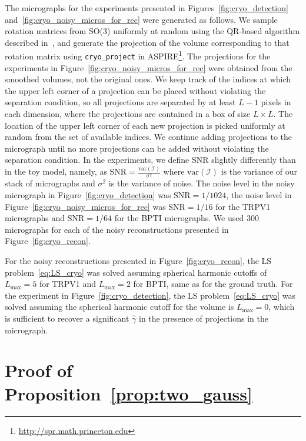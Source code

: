 \documentclass[12pt]{article}
\newcommand{\1}{\mathbf{1}}
\theoremstyle{plain}
\theoremstyle{definition}
\theoremstyle{remark}
\theoremstyle{plain}
\theoremstyle{remark}
\theoremstyle{plain}
\theoremstyle{plain}
\begin{document}
The micrographs for the experiments presented in Figures~\ref{fig:cryo_detection}  {and~\ref{fig:cryo_noisy_micros_for_rec}} were generated as follows. 
We sample rotation matrices from SO(3) uniformly at random using the QR-based algorithm described in~\cite{stewart1980efficient}, and generate the projection of the volume corresponding to that rotation matrix using \verb|cryo_project| in ASPIRE\footnote{\url{http://spr.math.princeton.edu}}. The projections for the experiments in Figure~\ref{fig:cryo_noisy_micros_for_rec} were obtained from the smoothed volumes, not the original ones. 
We keep track of the indices at which the upper left corner of a projection can be placed without violating the separation condition, so all projections are separated by at least {$L-1$ pixels in each dimension, where  the projections are contained in a box of size $L\times L$.}  The location of the upper left corner of each new projection is picked uniformly at random from the set of available indices. We continue adding projections to the micrograph until no more projections can be added without violating the separation condition. In the experiments, we define SNR slightly differently than in the toy model, namely, as $\text{SNR} = \frac{\text{var}(\mathcal{I})}{\sigma^2}$ where $\text{var}(\mathcal{I})$ is the variance of our stack of micrographs and $\sigma^2$ is the variance of noise. The noise level in the noisy micrograph in Figure~\ref{fig:cryo_detection} was $\text{SNR} = 1/1024$, the noise level in Figure~\ref{fig:cryo_noisy_micros_for_rec} was $\text{SNR} = 1/16$ for the TRPV1 micrographs and $\text{SNR} = 1/64$ for the BPTI micrographs. We used 300 micrographs for each of the noisy reconstructions presented in Figure~\ref{fig:cryo_recon}.

For the noisy reconstructions presented in Figure~\ref{fig:cryo_recon}, the LS problem~\eqref{eq:LS_cryo} was solved assuming spherical harmonic cutoffs of $L_{\text{max}} = 5$ for TRPV1 and $L_{\text{max}} = 2$ for BPTI, same as for the ground truth.
For the experiment in Figure~\ref{fig:cryo_detection}, the LS problem~\eqref{eq:LS_cryo} was solved assuming the spherical harmonic cutoff for the volume is $L_{\text{max}}=0$, which is sufficient to recover a significant $\widehat\gamma$ in the presence of projections in the micrograph.

\section{Proof of Proposition~\ref{prop:two_gauss}} \label{sec:proof_two_gauss}
\end{document}
